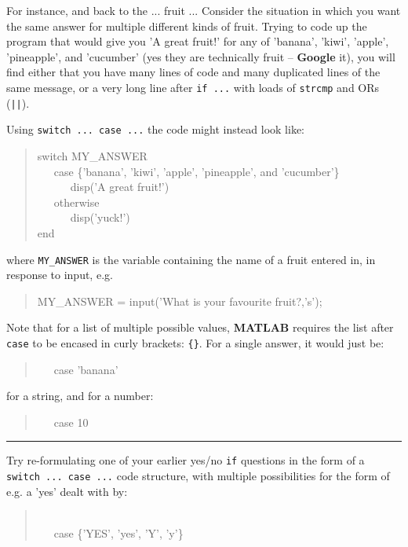 \documentclass{tufte-book} %
\newenvironment{docspec}{\begin{quotation}\ttfamily\parskip0pt\parindent0pt\ignorespaces}{\end{quotation}}
\newenvironment{docspecmargin}{\begin{quotation}\ttfamily\footnotesize\parskip0pt\parindent0pt\ignorespaces}{\end{quotation}}
\begin{document}
For instance, and back to the ... fruit ... Consider the situation in which you want the same answer for multiple different kinds of fruit. Trying to code up the program that would give you 'A great fruit!' for any of 'banana', 'kiwi', 'apple', 'pineapple', and 'cucumber' (yes they are technically fruit -- \textbf{Google} it), you will find either that you have many lines of code and many duplicated lines of the same message, or a very long line after \texttt{if ...} with loads of \texttt{strcmp} and ORs (\texttt{||}).

Using \texttt{switch ... case ...} the code might instead look like:
 
\begin{docspecmargin}
switch MY\_ANSWER
\\ \ \ \ case \{'banana', 'kiwi', 'apple', 'pineapple', and 'cucumber'\}
\\ \ \ \ \ \ \ disp('A great fruit!')
\\ \ \ \ otherwise
\\ \ \ \ \ \ \ disp('yuck!')
\\end
\end{docspecmargin}

\noindent where \texttt{MY\_ANSWER} is the variable containing the name of a fruit entered in, in response to input, e.g.
\begin{docspec}
MY\_ANSWER = input('What is your favourite fruit?,'s');
\end{docspec}

Note that for a list of multiple possible values, \textbf{MATLAB} requires the list after \texttt{case} to be encased in curly brackets: \texttt{\{\}}. For a single answer, it would just be:
\begin{docspec}
\ \ \ case 'banana'  
\end{docspec}
for a string, and for a number:
\begin{docspec}
\ \ \ case 10  
\end{docspec}

\vspace{1mm}
\noindent\rule{4cm}{0.5pt}
\vspace{1mm}

\noindent Try re-formulating one of your earlier yes/no \texttt{if} questions in the form of a \texttt{switch ... case ...} code structure, with multiple possibilities for the form of e.g. a 'yes' dealt with by:

\vspace{-4mm}
\begin{docspec}
\\ \ \ \ case \{'YES', 'yes', 'Y', 'y'\}
\end{docspec}
\end{document}
